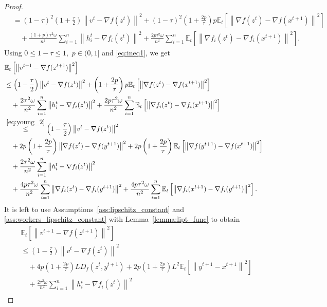 \documentclass{article} %
\newcommand{\norm}[1]{\left\| #1 \right\|}
\newcommand{\ExpSub}[2]{{\mathbb{E}}_{#1}\left[#2\right]}
\theoremstyle{plain}
\theoremstyle{definition}
\theoremstyle{remark}
\begin{document}
\begin{proof}
\begin{align*}
  &= (1 - \tau)^2 \left(1 + \frac{\tau}{2}\right) \norm{v^{t} - \nabla f(z^{t})}^2 + (1 - \tau)^2 \left(1 + \frac{2 p}{\tau}\right) p \ExpSub{t}{\norm{\nabla f(z^{t}) - \nabla f(x^{t+1})}^2} \\
  &\quad + \frac{(1 + p) \tau^2 \omega}{n^2} \sum_{i=1}^n \norm{h^t_i - \nabla f_i(z^{t})}^2 + \frac{2 p \tau^2 \omega}{n^2} \sum_{i=1}^n \ExpSub{t}{\norm{\nabla f_i(z^t) - \nabla f_i(x^{t+1})}^2}.
\end{align*}
Using $0 \leq 1 - \tau \leq 1,$ $p \in (0, 1]$ and \eqref{eq:ineq1}, we get
\begin{align*}
  &\ExpSub{t}{\norm{v^{t+1} - \nabla f(z^{t+1})}^2} \\
  &\leq \left(1 - \frac{\tau}{2}\right) \norm{v^{t} - \nabla f(z^{t})}^2 + \left(1 + \frac{2 p}{\tau}\right) p \ExpSub{t}{\norm{\nabla f(z^{t}) - \nabla f(x^{t+1})}^2} \\
  &\quad + \frac{2 \tau^2 \omega}{n^2} \sum_{i=1}^n \norm{h^t_i - \nabla f_i(z^{t})}^2 + \frac{2 p \tau^2 \omega}{n^2} \sum_{i=1}^n \ExpSub{t}{\norm{\nabla f_i(z^t) - \nabla f_i(x^{t+1})}^2} \\
  &\overset{\eqref{eq:young_2}}{\leq} \left(1 - \frac{\tau}{2}\right) \norm{v^{t} - \nabla f(z^{t})}^2 \\
  &\quad + 2 p \left(1 + \frac{2 p}{\tau}\right) \norm{\nabla f(z^{t}) - \nabla f(y^{t+1})}^2 + 2 p \left(1 + \frac{2 p}{\tau}\right) \ExpSub{t}{\norm{\nabla f(y^{t+1}) - \nabla f(x^{t+1})}^2} \\
  &\quad + \frac{2 \tau^2 \omega}{n^2} \sum_{i=1}^n \norm{h^t_i - \nabla f_i(z^{t})}^2 \\
  &\quad + \frac{4 p \tau^2 \omega}{n^2} \sum_{i=1}^n \norm{\nabla f_i(z^t) - \nabla f_i(y^{t+1})}^2 + \frac{4 p \tau^2 \omega}{n^2} \sum_{i=1}^n \ExpSub{t}{\norm{\nabla f_i(x^{t+1}) - \nabla f_i(y^{t+1})}^2}.
\end{align*}
It is left to use Assumptions~\ref{ass:lipschitz_constant} and \ref{ass:workers_lipschitz_constant} with Lemma~\ref{lemma:lipt_func} to obtain
\begin{align*}
  &\ExpSub{t}{\norm{v^{t+1} - \nabla f(z^{t+1})}^2} \\
  &\leq \left(1 - \frac{\tau}{2}\right) \norm{v^{t} - \nabla f(z^{t})}^2 \\
  &\quad + 4 p \left(1 + \frac{2 p}{\tau}\right) L D_f(z^t, y^{t+1}) + 2 p \left(1 + \frac{2 p}{\tau}\right) L^2 \ExpSub{t}{\norm{y^{t+1} - x^{t+1}}^2} \\
  &\quad + \frac{2 \tau^2 \omega}{n^2} \sum_{i=1}^n \norm{h^t_i - \nabla f_i(z^{t})}^2 \\

\end{align*}
\end{proof}
\end{document}
